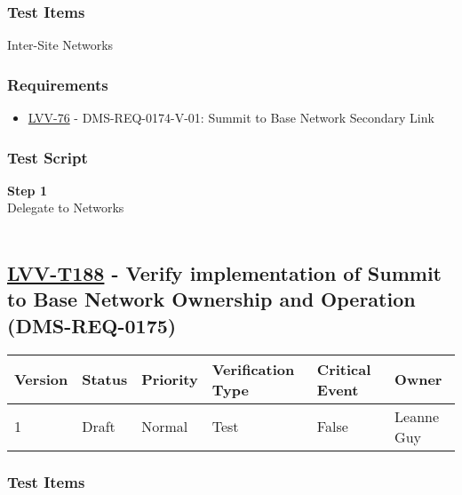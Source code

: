 \hypertarget{test-items-163}{%
\subsubsection{Test Items}\label{test-items-163}}

Inter-Site Networks~

\hypertarget{requirements-164}{%
\subsubsection{Requirements}\label{requirements-164}}

\begin{itemize}
\tightlist
\item
  \href{https://jira.lsstcorp.org/browse/LVV-76}{LVV-76} -
  DMS-REQ-0174-V-01: Summit to Base Network Secondary Link
\end{itemize}

\hypertarget{test-script-164}{%
\subsubsection{Test Script}\label{test-script-164}}

\textbf{Step 1}\\
Delegate to Networks\\
~\\

\hypertarget{lvv-t188---verify-implementation-of-summit-to-base-network-ownership-and-operation-dms-req-0175}{%
\subsection{\texorpdfstring{\href{https://jira.lsstcorp.org/secure/Tests.jspa\#/testCase/LVV-T188}{LVV-T188}
- Verify implementation of Summit to Base Network Ownership and
Operation
(DMS-REQ-0175)}{LVV-T188 - Verify implementation of Summit to Base Network Ownership and Operation (DMS-REQ-0175)}}\label{lvv-t188---verify-implementation-of-summit-to-base-network-ownership-and-operation-dms-req-0175}}

\begin{longtable}[]{@{}llllll@{}}
\toprule
Version & Status & Priority & Verification Type & Critical Event &
Owner\tabularnewline
\midrule
\endhead
1 & Draft & Normal & Test & False & Leanne Guy\tabularnewline
\bottomrule
\end{longtable}

\hypertarget{test-items-164}{%
\subsubsection{Test Items}\label{test-items-164}}

